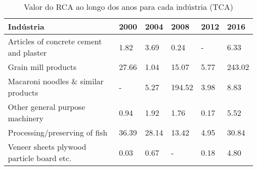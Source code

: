 \begin{table}
\centering
\caption{Valor do RCA ao longo dos anos para cada indústria (TCA)}
\begin{tabular}{p{6cm}p{1.5cm}p{1.5cm}p{1.5cm}p{1.5cm}p{1.5cm}}
\toprule
                                Indústria &  2000 &  2004 &   2008 & 2012 &   2016 \\
\midrule
  Articles of concrete cement and plaster &  1.82 &  3.69 &   0.24 &    - &   6.33 \\
                      Grain mill products & 27.66 &  1.04 &  15.07 & 5.77 & 243.02 \\
      Macaroni noodles \& similar products &     - &  5.27 & 194.52 & 3.98 &   8.83 \\
          Other general purpose machinery &  0.94 &  1.92 &   1.76 & 0.17 &   5.52 \\
            Processing/preserving of fish & 36.39 & 28.14 &  13.42 & 4.95 &  30.84 \\
Veneer sheets plywood particle board etc. &  0.03 &  0.67 &      - & 0.18 &   4.80 \\
\bottomrule
\end{tabular}
\end{table}
